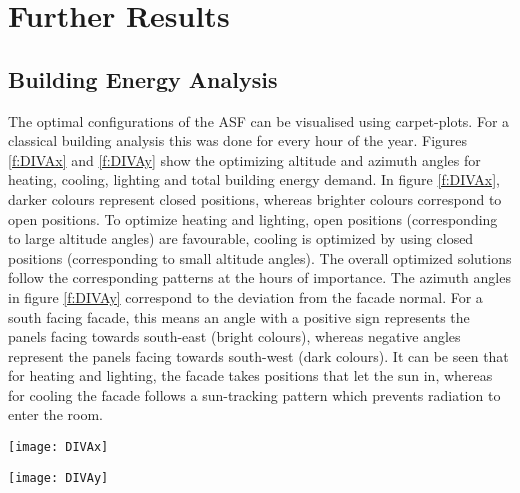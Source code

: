 
\chapter{Further Results}\label{furtherResults}

\section{Building Energy Analysis}
\label{s:buildingResults}
	
	The optimal configurations of the ASF can be visualised using carpet-plots. For a classical building analysis this was done for every hour of the year. Figures \ref{f:DIVAx} and \ref{f:DIVAy} show the optimizing altitude and azimuth angles for heating, cooling, lighting and total building energy demand. In figure \ref{f:DIVAx}, darker colours represent closed positions, whereas brighter colours correspond to open positions. To optimize heating and lighting, open positions (corresponding to large altitude angles) are favourable, cooling is optimized by using closed positions (corresponding to small altitude angles). The overall optimized solutions follow the corresponding patterns at the hours of importance. The azimuth angles in figure \ref{f:DIVAy} correspond to the deviation from the facade normal. For a south facing facade, this means an angle with a positive sign represents the panels facing towards south-east (bright colours), whereas negative angles represent the panels facing towards south-west (dark colours). It can be seen that for heating and lighting, the facade takes positions that let the sun in, whereas for cooling the facade follows a sun-tracking pattern which prevents radiation to enter the room. 

	\begin{figure*}
		\begin{center}
		\texttt{[image: DIVAx]}
		\caption{Carpet plots detailing the optimal altitude angles to minimise the (a) heating demand, (b) cooling demand, (c) lighting demand, and (d) total building energy demand. Darker colours represent closed positions, whereas brighter colors correspond to open positions. To optimize heating and lighting, open positions are favorable, cooling is optimized by using closed positions.}
		\label{f:DIVAx}
		\end{center}
	\end{figure*}


	\begin{figure*}
		\begin{center}
		\texttt{[image: DIVAy]}
		\caption{Carpet plots detailing the optimal azimuth angles to minimise the (a) heating demand, (b) cooling demand, (c) lighting demand, and (d) total building energy demand. Cooling is minimized by bocking the sun, whereas lighting and heating is minimized by opening the facade to let the insolation in.}
		\label{f:DIVAy}
		\end{center}
	\end{figure*}

